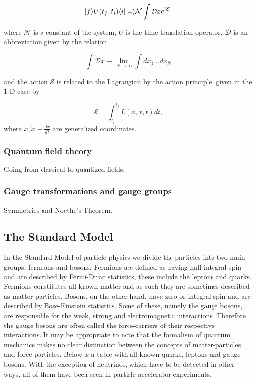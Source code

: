 \begin{equation}
	|f \rangle U(t_f,t_i) \langle i|= \rangle \mathcal{N} \int \mathcal{D}x e^{i\mathcal{S}},
\end{equation}

where $\mathcal{N}$ is a constant of the system, $U$ is the time translation operator, $\mathcal{D}$ is an abbreviation given by the relation 

\begin{equation}
	\int \mathcal{D} x \equiv \lim_{N \to \infty} \int dx_1 \dots dx_N
\end{equation}

and the action $\mathcal{S}$ is related to the Lagrangian by the action principle, given in the 1-D case by

\begin{equation}
	\mathcal{S} = \int_{t_i}^{t_f} L(x,\dot{x},t)dt,
\end{equation}
where $x, \dot{x} \equiv \frac{dx}{dt}$ are generalized coordinates.

\subsubsection{Quantum field theory}
Going from classical to quantized fields.

\subsubsection{Gauge transformations and gauge groups}
Symmetries and Noethe's Theorem.

\subsection{The Standard Model}

In the Standard Model of particle physics we divide the particles into two main groups; fermions and bosons. Fermions are defined as having half-integral spin and are described by Fermi-Dirac statistics, these include the leptons and quarks. Fermions constitutes all known matter and as such they are sometimes described as matter-particles. Bosons, on the other hand, have zero or integral spin and are described by Bose-Einstein statistics. Some of these, namely the gauge bosons, are responsible for the weak, strong and electromagnetic interactions. Therefore the gauge bosons are often called the force-carriers of their respective interactions. It may be appropriate to note that the formalism of quantum mechanics makes no clear distinction between the concepts of matter-particles and force-particles. Below is a table with all known quarks, leptons and gauge bosons. With the exception of neutrinos, which have to be detected in other ways, all of them have been seen in particle accelerator experiments.

